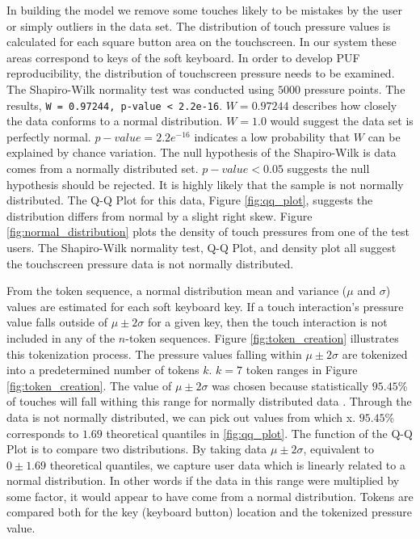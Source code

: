 \documentclass{acm_proc_article-sp}
\begin{document}
In building the model we remove some touches likely to be mistakes by the user or simply outliers in the data set.
The distribution of touch pressure values is calculated for each square button area on the touchscreen. 
In our system these areas correspond to keys of the soft keyboard.
In order to develop PUF reproducibility,
the distribution of touchscreen pressure needs to be examined.
%
The Shapiro-Wilk normality test\cite{shapiro1965analysis} was conducted
using $5000$ pressure points.
The results, {\tt W = 0.97244, p-value < 2.2e-16}.
$W=0.97244$ describes how closely the data conforms to a normal distribution.
$W=1.0$ would suggest the data set is perfectly normal.
$p-value=2.2e^{-16}$ indicates a low probability that
$W$ can be explained by chance variation.
%
The null hypothesis of the Shapiro-Wilk is
data comes from a normally distributed set.
$p-value<0.05$ suggests the null hypothesis should be rejected.
It is highly likely that the sample is not normally distributed.
%
The Q-Q Plot for this data, Figure \ref{fig:qq_plot},
suggests the distribution differs from normal
by a slight right skew.
%
Figure \ref{fig:normal_distribution} plots the density of 
touch pressures from one of the test users.
%
The Shapiro-Wilk normality test,
Q-Q Plot, 
and density plot
all suggest the touchscreen pressure data is not normally distributed.


From the token sequence,
a normal distribution mean and variance ($\mu$ and $\sigma$) values are estimated for each soft keyboard key.
%
If a touch interaction's pressure value falls outside of
$\mu \pm 2\sigma$ for a given key, 
then the touch interaction is not included in any of the $n$-token sequences. 
Figure \ref{fig:token_creation} illustrates 
this tokenization process.
The pressure values falling within $\mu \pm 2\sigma$ are tokenized
into a predetermined number of tokens $k$. 
$k=7$ token ranges in Figure \ref{fig:token_creation}.
The value of $\mu \pm 2\sigma$ was chosen because statistically $95.45$\% of touches 
will fall withing this range for normally distributed data \cite{threesigmarule}.
%
Through the data is not normally distributed,
we can pick out values from which x.
$95.45$\% corresponds to $1.69$ theoretical quantiles in \ref{fig:qq_plot}.
The function of the Q-Q Plot is to 
compare two distributions.
By taking data $\mu \pm 2\sigma$,
equivalent to $0 \pm 1.69$ theoretical quantiles,
we capture user data which is
linearly related to a normal distribution.
In other words if the data in this range
were multiplied by some factor,
it would appear to have come from a normal distribution.
%
Tokens are compared both for the key (keyboard button) location and the tokenized pressure value.
\end{document}
